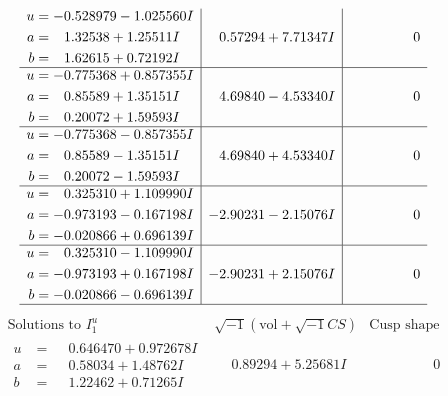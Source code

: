 \documentclass[1p]{elsarticle_modified}
\theoremstyle{definition}
\newcommand{\I}{\sqrt{-1}}
\begin{document}
$$\begin{array}{c|c|c}
\begin{aligned}
u &= -0.528979 - 1.025560 I \\
a &= \phantom{-}1.32538 + 1.25511 I \\
b &= \phantom{-}1.62615 + 0.72192 I\end{aligned}
 & \phantom{-}0.57294 + 7.71347 I & \phantom{-0.000000 } 0 \\ \hline\begin{aligned}
u &= -0.775368 + 0.857355 I \\
a &= \phantom{-}0.85589 + 1.35151 I \\
b &= \phantom{-}0.20072 + 1.59593 I\end{aligned}
 & \phantom{-}4.69840 - 4.53340 I & \phantom{-0.000000 } 0 \\ \hline\begin{aligned}
u &= -0.775368 - 0.857355 I \\
a &= \phantom{-}0.85589 - 1.35151 I \\
b &= \phantom{-}0.20072 - 1.59593 I\end{aligned}
 & \phantom{-}4.69840 + 4.53340 I & \phantom{-0.000000 } 0 \\ \hline\begin{aligned}
u &= \phantom{-}0.325310 + 1.109990 I \\
a &= -0.973193 - 0.167198 I \\
b &= -0.020866 + 0.696139 I\end{aligned}
 & -2.90231 - 2.15076 I & \phantom{-0.000000 } 0 \\ \hline\begin{aligned}
u &= \phantom{-}0.325310 - 1.109990 I \\
a &= -0.973193 + 0.167198 I \\
b &= -0.020866 - 0.696139 I\end{aligned}
 & -2.90231 + 2.15076 I & \phantom{-0.000000 } 0\\
 \hline 
 \end{array}$$\newpage$$\begin{array}{c|c|c}  
\text{Solutions to }I^u_{1}& \I (\text{vol} + \sqrt{-1}CS) & \text{Cusp shape}\\
 \hline 
\begin{aligned}
u &= \phantom{-}0.646470 + 0.972678 I \\
a &= \phantom{-}0.58034 + 1.48762 I \\
b &= \phantom{-}1.22462 + 0.71265 I\end{aligned}
 & \phantom{-}0.89294 + 5.25681 I & \phantom{-0.000000 } 0 \\ \hline\begin{aligned}

\end{aligned}
\end{array}$$
\end{document}
